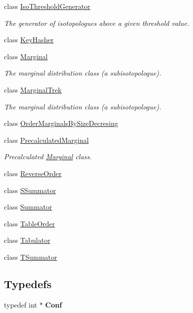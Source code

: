 \begin{DoxyCompactItemize}
class \mbox{\hyperlink{class_iso_spec_1_1_iso_threshold_generator}{Iso\+Threshold\+Generator}}
\begin{DoxyCompactList}\small\item\em The generator of isotopologues above a given threshold value. \end{DoxyCompactList}\item 
class \mbox{\hyperlink{class_iso_spec_1_1_key_hasher}{Key\+Hasher}}
\item 
class \mbox{\hyperlink{class_iso_spec_1_1_marginal}{Marginal}}
\begin{DoxyCompactList}\small\item\em The marginal distribution class (a subisotopologue). \end{DoxyCompactList}\item 
class \mbox{\hyperlink{class_iso_spec_1_1_marginal_trek}{Marginal\+Trek}}
\begin{DoxyCompactList}\small\item\em The marginal distribution class (a subisotopologue). \end{DoxyCompactList}\item 
class \mbox{\hyperlink{class_iso_spec_1_1_order_marginals_by_size_decresing}{Order\+Marginals\+By\+Size\+Decresing}}
\item 
class \mbox{\hyperlink{class_iso_spec_1_1_precalculated_marginal}{Precalculated\+Marginal}}
\begin{DoxyCompactList}\small\item\em Precalculated \mbox{\hyperlink{class_iso_spec_1_1_marginal}{Marginal}} class. \end{DoxyCompactList}\item 
class \mbox{\hyperlink{class_iso_spec_1_1_reverse_order}{Reverse\+Order}}
\item 
class \mbox{\hyperlink{class_iso_spec_1_1_s_summator}{S\+Summator}}
\item 
class \mbox{\hyperlink{class_iso_spec_1_1_summator}{Summator}}
\item 
class \mbox{\hyperlink{class_iso_spec_1_1_table_order}{Table\+Order}}
\item 
class \mbox{\hyperlink{class_iso_spec_1_1_tabulator}{Tabulator}}
\item 
class \mbox{\hyperlink{class_iso_spec_1_1_t_summator}{T\+Summator}}
\end{DoxyCompactItemize}
\subsection*{Typedefs}
\begin{DoxyCompactItemize}
\item 
\mbox{\label{namespace_iso_spec_a5e5cbcb7f667e0610638d0a4372899c1}} 
typedef int $\ast$ {\bfseries Conf}
\end{DoxyCompactItemize}

